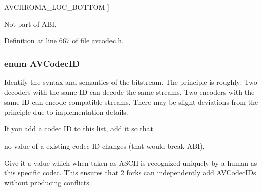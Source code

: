 \begin{Desc}
\begin{description}
{A\+V\+C\+H\+R\+O\+M\+A\+\_\+\+L\+O\+C\+\_\+\+B\+O\+T\+T\+OM\hypertarget{group__lavc__core_gga1f86ed1b6a420faccacf77c98db6c1ffa49912072e8ede85302a89ec306d72800}{}\label{group__lavc__core_gga1f86ed1b6a420faccacf77c98db6c1ffa49912072e8ede85302a89ec306d72800}
}]\item[{\em 
A\+V\+C\+H\+R\+O\+M\+A\+\_\+\+L\+O\+C\+\_\+\+NB\hypertarget{group__lavc__core_gga1f86ed1b6a420faccacf77c98db6c1ffa7405857a2cc2ca000ba14247137d3a15}{}\label{group__lavc__core_gga1f86ed1b6a420faccacf77c98db6c1ffa7405857a2cc2ca000ba14247137d3a15}
}]Not part of A\+BI. \end{description}
\end{Desc}


Definition at line 667 of file avcodec.\+h.

\subsubsection[{\texorpdfstring{A\+V\+Codec\+ID}{AVCodecID}}]{\setlength{\rightskip}{0pt plus 5cm}enum {\bf A\+V\+Codec\+ID}}\hypertarget{group__lavc__core_gaadca229ad2c20e060a14fec08a5cc7ce}{}\label{group__lavc__core_gaadca229ad2c20e060a14fec08a5cc7ce}
Identify the syntax and semantics of the bitstream. The principle is roughly\+: Two decoders with the same ID can decode the same streams. Two encoders with the same ID can encode compatible streams. There may be slight deviations from the principle due to implementation details.

If you add a codec ID to this list, add it so that
\begin{DoxyEnumerate}
\item no value of a existing codec ID changes (that would break A\+BI),
\item Give it a value which when taken as A\+S\+C\+II is recognized uniquely by a human as this specific codec. This ensures that 2 forks can independently add A\+V\+Codec\+I\+Ds without producing conflicts.
\end{DoxyEnumerate}


